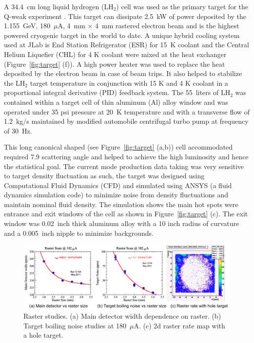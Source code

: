 A 34.4~cm long liquid hydrogen (LH$_{2}$) cell was used as the primary target for the Q-weak experiment \cite{greg_target_hydrogen}. This target can dissipate 2.5~kW of power deposited by the 1.155~GeV, 180~$\mu$A, 4~mm $\times$ 4~mm rastered 
electron beam and is the highest powered cryogenic target in the world to date. A unique hybrid cooling system used at JLab is End Station Refrigerator (ESR) for 15~K coolant and the Central Helium Liquefier (CHL) for 4 K coolant were mixed at the heat exchanger (Figure~\ref{fig:target} (f)). A high power heater was used to replace the heat deposited by the electron beam in case of beam trips. It also helped to stabilize the LH$_{2}$ target temperature in conjunction with 15 K and 4 K coolant in a proportional integral derivative (PID) feedback system. The 55~liters of LH$_{2}$ was contained within a target cell of thin aluminum (Al) alloy window and was operated under 35 psi pressure at 20~K temperature and with a transverse flow of 1.2~kg/s maintained by modified automobile centrifugal turbo pump at frequency of 30~Hz. 

This long canonical shaped (see Figure~\ref{fig:target} (a,b)) cell accommodated required 7.9\degrees{} scattering angle and helped to achieve the high luminosity and hence the statistical goal. The current mode production data taking was very sensitive to target density fluctuation as such, the target was designed using Computational Fluid Dynamics (CFD) and simulated using ANSYS \cite{website:ansys} (a fluid dynamics simulation code) to minimize noise from density fluctuations and maintain nominal fluid density. The simulation shows the main hot spots were entrance and exit windows of the cell as shown in Figure~\ref{fig:target} (c). The exit window was 0.02~inch thick aluminum alloy with a 10 inch radius of curvature and a 0.005~inch nipple to minimize backgrounds.


\begin{singlespace}
\begin{figure}[!h]
	\begin{center}
	\includegraphics[width=15cm]{figures/raster}
	\caption
	{Raster studies. (a) Main detector width dependence on raster. (b) Target boiling noise studies at 180~$\mu$A\cite{kmyers_qweak}. (c) 2d raster rate map with a hole target.}
	\label{fig:raster}
	\end{center}
\end{figure}
\end{singlespace}

